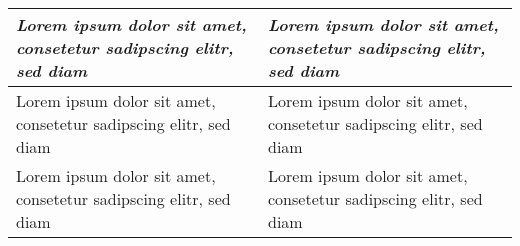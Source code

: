 

\begin{table}[htb]

\ifthenelse{\isundefined{\tabLenA}}{\newlength{\tabLenA}}{}
\ifthenelse{\isundefined{\tabLenB}}{\newlength{\tabLenB}}{}

\setlength{\tabLenA}{0.10\textwidth}
\setlength{\tabLenB}{0.20\textwidth}

\begin{tabularx}{\textwidth}{p{\tabLenA}p{\tabLenB}}
\toprule

\textbf{\textit{Lorem ipsum dolor sit amet, consetetur sadipscing elitr, sed diam}}
&

\textbf{\textit{Lorem ipsum dolor sit amet, consetetur sadipscing elitr, sed diam}}
\\
\toprule

Lorem ipsum dolor sit amet, consetetur sadipscing elitr, sed diam
&

Lorem ipsum dolor sit amet, consetetur sadipscing elitr, sed diam
\\

Lorem ipsum dolor sit amet, consetetur sadipscing elitr, sed diam
&

Lorem ipsum dolor sit amet, consetetur sadipscing elitr, sed diam
\\
\bottomrule
\end{tabularx}
\end{table}
